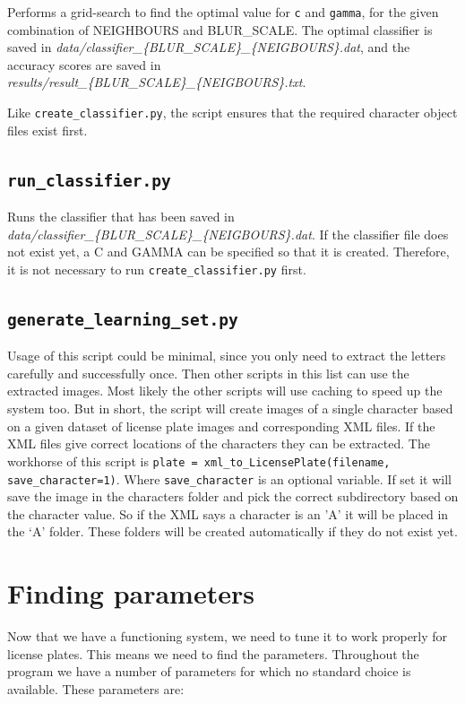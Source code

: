\documentclass[a4paper]{article}
\begin{document}
Performs a grid-search to find the optimal value for \texttt{c} and
\texttt{gamma}, for the given combination of NEIGHBOURS and BLUR\_SCALE. The
optimal classifier is saved in
\emph{data/classifier\_\{BLUR\_SCALE\}\_\{NEIGBOURS\}.dat}, and the accuracy
scores are saved in
\emph{results/result\_\{BLUR\_SCALE\}\_\{NEIGBOURS\}.txt}.

Like \texttt{create\_classifier.py}, the script ensures that the required
character object files exist first.

\subsection*{\texttt{run\_classifier.py}}

Runs the classifier that has been saved in
\emph{data/classifier\_\{BLUR\_SCALE\}\_\{NEIGBOURS\}.dat}. If the classifier
file does not exist yet, a C and GAMMA can be specified so that it is created.
Therefore, it is not necessary to run \texttt{create\_classifier.py} first.

\subsection*{\texttt{generate\_learning\_set.py}}

Usage of this script could be minimal, since you only need to extract the
letters carefully and successfully once. Then other scripts in this list can
use the extracted images. Most likely the other scripts will use caching to
speed up the system too. But in short, the script will create images of a single
character based on a given dataset of license plate images and corresponding
XML files. If the XML files give correct locations of the characters they can
be extracted. The workhorse of this script is \texttt{plate =
xml\_to\_LicensePlate(filename, save\_character=1)}. Where
\texttt{save\_character} is an optional variable. If set it will save the image
in the characters folder and pick the correct subdirectory based on the
character value. So if the XML says a character is an 'A' it will be placed in
the `A' folder. These folders will be created automatically if they do not
exist yet.

\section{Finding parameters}

Now that we have a functioning system, we need to tune it to work properly for
license plates. This means we need to find the parameters. Throughout the
program we have a number of parameters for which no standard choice is
available. These parameters are:
\end{document}
